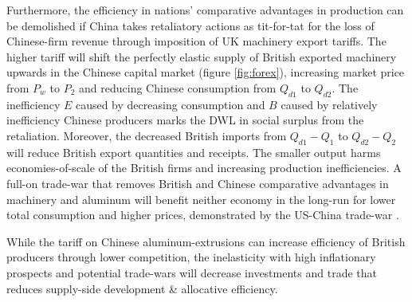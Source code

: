 \documentclass[a4paper,12pt]{article}
\begin{document}
Furthermore, the efficiency in nations' comparative advantages in production can be demolished if China takes retaliatory actions as tit-for-tat for the loss of Chinese-firm revenue through imposition of UK machinery export tariffs. The higher tariff will shift the perfectly elastic supply of British exported machinery upwards in the Chinese capital market (figure \ref{fig:forex}), increasing market price from $P_w$ to $P_2$ and reducing Chinese consumption from $Q_{d1}$ to $Q_{d2}$. The inefficiency $E$ caused by decreasing consumption and $B$ caused by relatively inefficiency Chinese producers marks the DWL in social surplus from the retaliation. Moreover, the decreased British imports from $Q_{d1}-Q_1$ to $Q_{d2}-Q_2$ will reduce British export quantities and receipts. The smaller output harms economies-of-scale of the British firms and increasing production inefficiencies. A full-on trade-war that removes British and Chinese comparative advantages in machinery and aluminum will benefit neither economy in the long-run for lower total consumption and higher prices, demonstrated by the US-China trade-war \parencite{hass_denmark_2022}.




While the tariff on Chinese aluminum-extrusions can increase efficiency of British producers through lower competition, the inelasticity with high inflationary prospects and potential trade-wars will decrease investments and trade that reduces supply-side development \& allocative efficiency.



\newpage
\printbibliography
\end{document}
